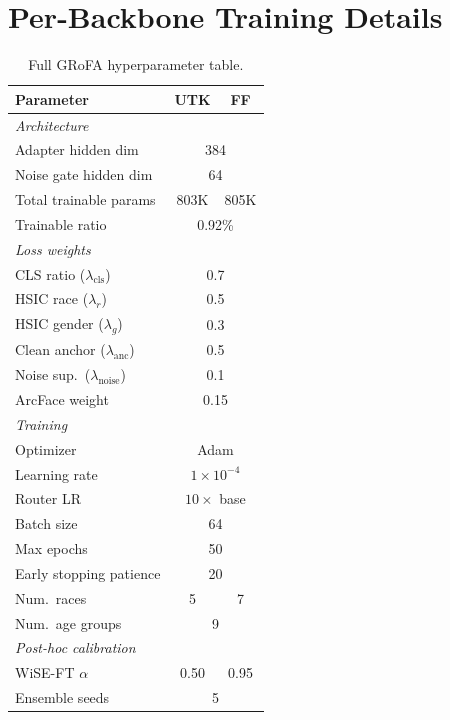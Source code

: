 
\section{Per-Backbone Training Details}
\label{app:backbone_details}

\begin{table}[htbp]
\caption{Full GRoFA hyperparameter table.}
\label{tab:hyperparams}
\centering
\small
\setlength{\tabcolsep}{4pt}
\renewcommand{\arraystretch}{1.0}
\begin{tabular}{lcc}
\toprule
Parameter & UTK & FF \\
\midrule
\multicolumn{3}{l}{\textit{Architecture}} \\
\quad Adapter hidden dim & \multicolumn{2}{c}{384} \\
\quad Noise gate hidden dim & \multicolumn{2}{c}{64} \\
\quad Total trainable params & 803K & 805K \\
\quad Trainable ratio & \multicolumn{2}{c}{0.92\%} \\
\midrule
\multicolumn{3}{l}{\textit{Loss weights}} \\
\quad CLS ratio ($\lambda_{\text{cls}}$) & \multicolumn{2}{c}{0.7} \\
\quad HSIC race ($\lambda_r$) & \multicolumn{2}{c}{0.5} \\
\quad HSIC gender ($\lambda_g$) & \multicolumn{2}{c}{0.3} \\
\quad Clean anchor ($\lambda_{\text{anc}}$) & \multicolumn{2}{c}{0.5} \\
\quad Noise sup.\ ($\lambda_{\text{noise}}$) & \multicolumn{2}{c}{0.1} \\
\quad ArcFace weight & \multicolumn{2}{c}{0.15} \\
\midrule
\multicolumn{3}{l}{\textit{Training}} \\
\quad Optimizer & \multicolumn{2}{c}{Adam} \\
\quad Learning rate & \multicolumn{2}{c}{$1{\times}10^{-4}$} \\
\quad Router LR & \multicolumn{2}{c}{$10\times$ base} \\
\quad Batch size & \multicolumn{2}{c}{64} \\
\quad Max epochs & \multicolumn{2}{c}{50} \\
\quad Early stopping patience & \multicolumn{2}{c}{20} \\
\quad Num.\ races & 5 & 7 \\
\quad Num.\ age groups & \multicolumn{2}{c}{9} \\
\midrule
\multicolumn{3}{l}{\textit{Post-hoc calibration}} \\
\quad WiSE-FT $\alpha$ & 0.50 & 0.95 \\
\quad Ensemble seeds & \multicolumn{2}{c}{5} \\
\bottomrule
\end{tabular}
\end{table}

